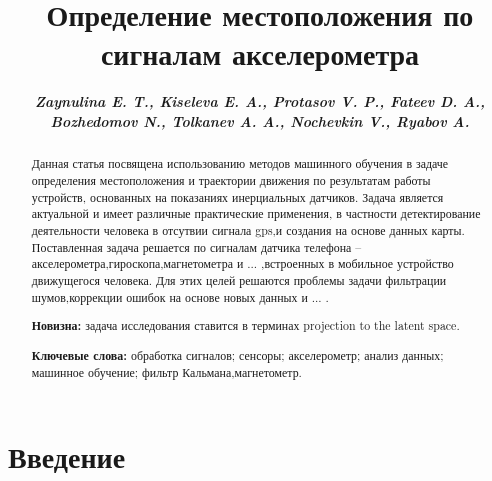 \documentclass[12pt, a4paper]{article}
\begin{document}
\title{\textbf{Определение местоположения по сигналам акселерометра}}
\author{\bf \em Zaynulina E. T., Kiseleva E. A., Protasov V. P., Fateev D. A.,\\
 \bf \em Bozhedomov N., Tolkanev A. A., Nochevkin V., Ryabov A. }
\date{}
\maketitle


\begin{abstract}
	Данная статья посвящена использованию методов машинного обучения в задаче определения
местоположения и траектории движения по результатам работы устройств, основанных на показаниях инерциальных датчиков. Задача является актуальной и имеет различные практические применения, в частности детектирование деятельности человека в отсутвии сигнала gps,и создания на основе данных карты. Поставленная задача решается по сигналам датчика телефона – акселерометра,гироскопа,магнетометра и ... ,встроенных в мобильное устройство движущегося человека. Для этих целей решаются проблемы задачи фильтрации шумов,коррекции ошибок на основе новых данных и ... .

{\bf Новизна:} задача исследования ставится в терминах projection to the latent space.

{\bf Ключевые слова:}  обработка сигналов; сенсоры; акселерометр; анализ данных; машинное обучение; фильтр Кальмана,магнетометр.
\end{abstract}



\setcounter{secnumdepth}{0}
\section{Введение}



\begin{thebibliography}{4}
\end{thebibliography}
\end{document}
